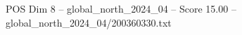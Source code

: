 \begin{textsample}{POS Dim 8 – global\_north\_2024\_04 – Score 15.00 – global\_north\_2024\_04/200360330.txt}
\end{textsample}
